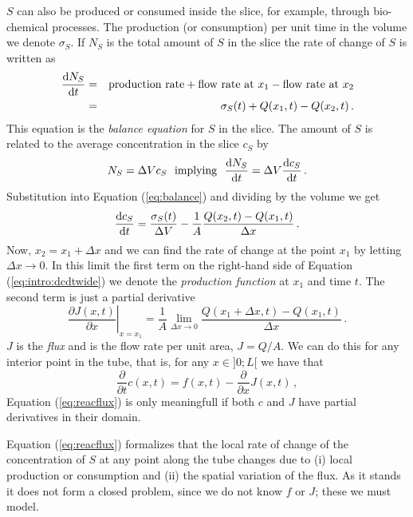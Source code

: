 $S$ can also be produced or consumed inside the slice, for example, through bio-chemical processes. 
The production (or consumption) per unit time in the volume we denote $\sigma_S$. 
If $N_S$ is the total amount of $S$ in the slice the rate of change of $S$ is written as
\begin{eqnarray}
	\frac{\mathrm{d} N_S}{\mathrm{d} t} &=& \text{production rate} + \text{flow rate at} \ x_1 -
	\text{flow rate at} \ x_2 \nonumber \\
	&=& \sigma_S(t) + Q(x_1, t) - Q(x_2,t) \, . \label{eq:balance}
\end{eqnarray}
This equation is the \emph{balance equation}  for  $S$ in the slice. 
The amount of $S$ is related to the average concentration in the slice $c_S$ by 
\begin{equation}
	N_S = \Delta V c_S \ \ \mathrm{implying} \ \ \frac{\mathrm{d} N_S}{\mathrm{d} t} = \Delta
	V \frac{\mathrm{d} c_S}{\mathrm{d} t} \, . 
\end{equation}
Substitution into Equation (\ref{eq:balance}) and dividing by the volume we get
\begin{equation}
	\label{eq:intro:dcdtwide}
	\frac{\mathrm{d} c_S}{\mathrm{d} t} = \frac{\sigma_S(t)}{\Delta V} - \frac{1}{A} \frac{Q(x_2,t)-Q(x_1,t)}{\Delta x} \, .
\end{equation}
Now, $x_2 = x_1 + \Delta x$ and we can find the rate of change at the point $x_1$ by letting $\Delta x
\rightarrow 0$. In this limit the first term on the right-hand side of Equation
(\ref{eq:intro:dcdtwide}) we denote the \emph{production function}
 at $x_1$ and time $t$. The second term is just a partial derivative 
\begin{equation}
	\left. \frac{\partial  J(x,t)}{\partial x}\right|_{x=x_1} = \frac{1}{A}\lim_{\Delta x \rightarrow 0} \frac{Q(x_1 + \Delta
	x, t)-Q(x_1,t)}{\Delta x} \, .
\end{equation}
$J$ is the \emph{flux} and is the flow rate per unit area, $J=Q/A$. We can do this for any
interior point in the tube, that is, for any $x \in ]0;L[$ we have that
\begin{equation}
	\label{eq:reacflux}
	\frac{\partial}{\partial t} c(x,t)= f(x,t) - \frac{\partial}{\partial x}J(x,t) \, ,
\end{equation}
Equation (\ref{eq:reacflux}) is only meaningfull if both $c$ and $J$ have partial derivatives in their domain.

Equation (\ref{eq:reacflux}) formalizes that the local rate of change of
the concentration of $S$ at any point along the tube changes due to (i) 
local production or consumption and (ii) the spatial variation of the flux. 
As it stands it does not form a closed problem, since we do not know $f$ or $J$; these we must model.

